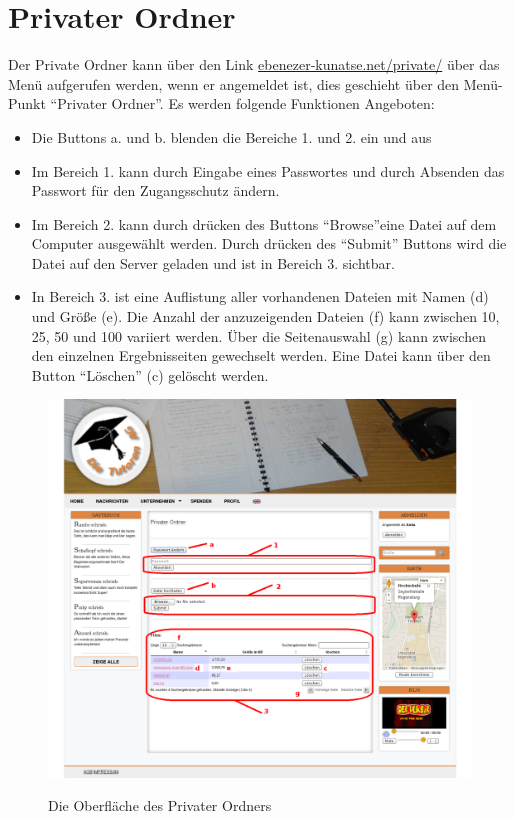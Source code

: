 
\section{Privater Ordner}

Der Private Ordner kann über den Link \url{ebenezer-kunatse.net/private/} über das Menü aufgerufen werden, wenn er angemeldet ist, dies geschieht über den Menü-Punkt "`Privater Ordner"'. Es werden folgende Funktionen Angeboten:



\begin{itemize}
 \item Die Buttons a. und b. blenden die Bereiche 1. und 2. ein und aus
 \item Im Bereich 1. kann durch Eingabe eines Passwortes und durch Absenden das Passwort für den Zugangsschutz ändern.
 \item Im Bereich 2. kann durch drücken des Buttons "`Browse"'eine Datei auf dem Computer ausgewählt werden. Durch drücken des "`Submit"' Buttons wird die Datei auf den Server geladen und ist in Bereich 3. sichtbar.
 \item In Bereich 3. ist eine Auflistung aller vorhandenen Dateien mit Namen (d) und Größe (e). Die Anzahl der anzuzeigenden Dateien (f) kann zwischen 10, 25, 50 und 100 variiert werden. Über die Seitenauswahl (g) kann zwischen den einzelnen Ergebnisseiten gewechselt werden. Eine Datei kann über den Button "`Löschen"' (c) gelöscht werden.
\end{itemize}


\begin{figure}[!htbp]
 \centering
 \includegraphics[width=1\textwidth]{../Screenshots/private/Privater_Ordner_passwd_upload}
 \label{fig:privatedir}
 \caption{Die Oberfläche des Privater Ordners}
\end{figure}

